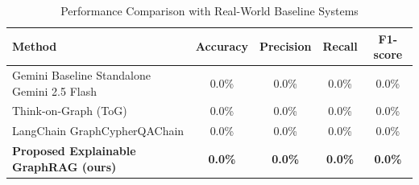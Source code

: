 \begin{table}[h]
\centering
\caption{Performance Comparison with Real-World Baseline Systems}
\label{tab:performance_v2}
\begin{tabular}{|l|c|c|c|c|}
\hline
\textbf{Method} & \textbf{Accuracy} & \textbf{Precision} & \textbf{Recall} & \textbf{F1-score} \\
\hline
Gemini Baseline Standalone Gemini 2.5 Flash & 0.0\% & 0.0\% & 0.0\% & 0.0\% \\
Think-on-Graph (ToG) & 0.0\% & 0.0\% & 0.0\% & 0.0\% \\
LangChain GraphCypherQAChain & 0.0\% & 0.0\% & 0.0\% & 0.0\% \\
\textbf{Proposed Explainable GraphRAG (ours)} & \textbf{0.0\%} & \textbf{0.0\%} & \textbf{0.0\%} & \textbf{0.0\%} \\
\hline
\end{tabular}
\end{table}
